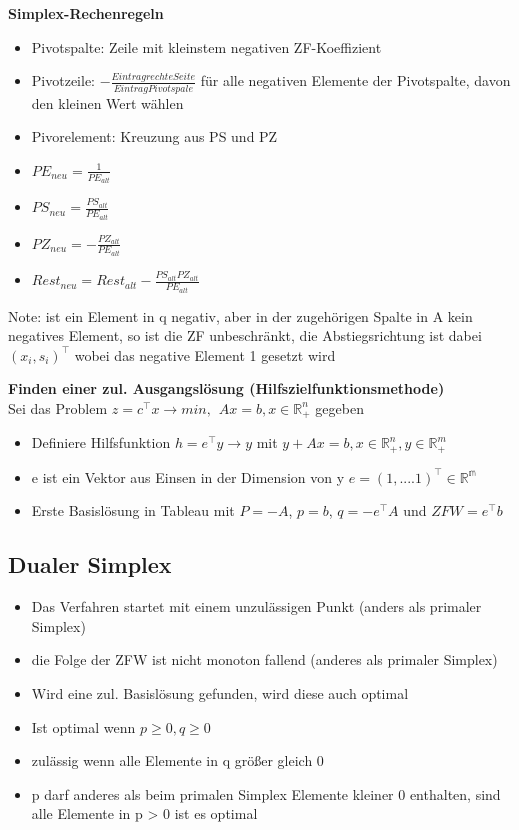\documentclass[12pt,a4paper, hyperref]{article}
\begin{document}
\textbf{Simplex-Rechenregeln}
\begin{itemize}
\item Pivotspalte: Zeile mit kleinstem negativen ZF-Koeffizient
\item Pivotzeile: $-\frac{Eintrag rechte Seite}{Eintrag Pivotspale}$ für alle negativen Elemente der Pivotspalte, davon den kleinen Wert wählen
\item Pivorelement: Kreuzung aus PS und PZ
\item $PE_{neu} = \frac{1}{PE_{alt}}$
\item $PS_{neu} = \frac{PS_{alt}}{PE_{alt}}$
\item $PZ_{neu} = -\frac{PZ_{alt}}{PE_{alt}}$
\item $Rest_{neu} = Rest_{alt}-\frac{PS_{alt} PZ_{alt}}{PE_{alt}}$
\end{itemize}
Note: ist ein Element in q negativ, aber in der zugehörigen Spalte in A kein negatives Element, so ist die ZF unbeschränkt, die Abstiegsrichtung ist dabei $(x_i, s_i)^\intercal$ wobei das negative Element 1 gesetzt wird\\
\hspace{1pt}

\textbf{Finden einer zul. Ausgangslösung (Hilfszielfunktionsmethode)}\\
Sei das Problem $z=c^\intercal x \rightarrow min, \hspace{5pt} Ax = b, x \in \mathbb{R}_{+}^n$ gegeben
\begin{itemize}
\item Definiere Hilfsfunktion $h = e^\intercal y \rightarrow y$ mit $y+Ax=b, x\in \mathbb{R}_{+}^{n}, y \in \mathbb{R}_{+}^{m}$
\item e ist ein Vektor aus Einsen in der Dimension von y $e=(1,....1)^\intercal \in \mathbb{R^m}$
\item Erste Basislösung in Tableau mit $P = -A$, $p = b$, $q = -e^\intercal A$ und $ZFW = e^\intercal b$
\end{itemize}

\subsection{Dualer Simplex}

\begin{itemize}
\item Das Verfahren startet mit einem unzulässigen Punkt (anders als primaler Simplex)
\item die Folge der ZFW ist nicht monoton fallend (anderes als primaler Simplex)
\item Wird eine zul. Basislösung gefunden, wird diese auch optimal
\item Ist optimal wenn $p \geq 0, q \geq 0$
\item zulässig wenn alle Elemente in q größer gleich 0
\item p darf anderes als beim primalen Simplex Elemente kleiner 0 enthalten, sind alle Elemente in p > 0 ist es optimal
\end{itemize}
\end{document}
